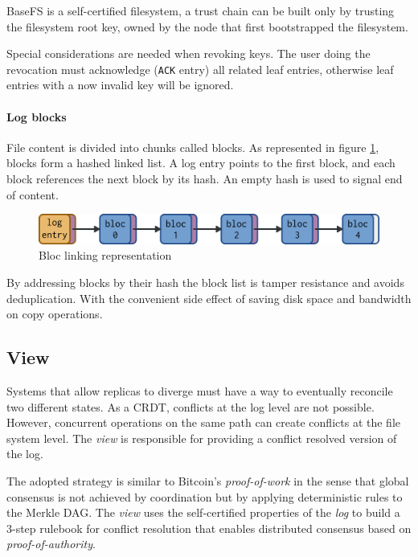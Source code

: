 \documentclass{sig-alternate}
\begin{document}
BaseFS is a self-certified filesystem, a trust chain can be built only by trusting the filesystem root key, owned by the node that first bootstrapped the filesystem.

Special considerations are needed when revoking keys. The user doing the revocation must acknowledge (\texttt{ACK} entry) all related leaf entries, otherwise leaf entries with a now invalid key will be ignored.


\paragraph{Log blocks}

File content is divided into chunks called blocks. As represented in figure \ref{fig:blocs}, blocks form a hashed linked list. A log entry points to the first block, and each block references the next block by its hash. An empty hash is used to signal end of content.

\begin{figure}
\centering
\includegraphics[width=\columnwidth]{imgs/blocs.png}
\caption{Bloc linking representation}
\label{fig:blocs}
\end{figure}

By addressing blocks by their hash the block list is tamper resistance and avoids deduplication. With the convenient side effect of saving disk space and bandwidth on copy operations.

\subsection{View} \label{view}

Systems that allow replicas to diverge must have a way to eventually reconcile two different states. As a CRDT, conflicts at the log level are not possible. However, concurrent operations on the same path can create conflicts at the file system level. The \textit{view} is responsible for providing a conflict resolved version of the log.

The adopted strategy is similar to Bitcoin's \textit{proof-of-work} in the sense that global consensus is not achieved by coordination but by applying deterministic rules to the Merkle DAG. The \textit{view} uses the self-certified properties of the \textit{log} to build a 3-step rulebook for conflict resolution that enables distributed consensus based on \textit{proof-of-authority}.
\end{document}
